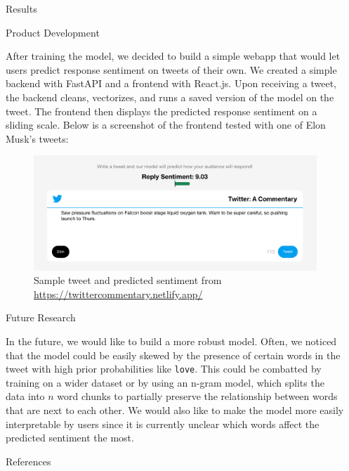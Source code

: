 \documentclass[final]{beamer}
\def\code#1{\texttt{#1}}
\newlength{\sepwidth}
\newlength{\colwidth}
\newcommand{\separatorcolumn}{\begin{column}{\sepwidth}\end{column}}
\begin{document}
\begin{frame}[t]
\begin{columns}[t]
\begin{column}{\colwidth}
\begin{alertblock}{Results}
    


  \end{alertblock}

  \begin{block}{Product Development}

    After training the model, we decided to build a simple webapp that would let users predict response sentiment on tweets of their own. We created a simple backend with FastAPI and a frontend with React.js. Upon receiving a tweet, the backend cleans, vectorizes, and runs a saved version of the model on the tweet. The frontend then displays the predicted response sentiment on a sliding scale. Below is a screenshot of the frontend tested with one of Elon Musk's tweets:

    \begin{figure}[H]
      \centering
      \includegraphics[width=1\textwidth]{product.png}
      \caption{Sample tweet and predicted sentiment from \href{https://twittercommentary.netlify.app/}{https://twittercommentary.netlify.app/}}
    \end{figure}

  \end{block}

  \begin{block}{Future Research}

    In the future, we would like to build a more robust model. Often, we noticed that the model could be easily skewed by the presence of certain words in the tweet with high prior probabilities like \code{love}. This could be combatted by training on a wider dataset or by using an n-gram model, which splits the data into $n$ word chunks to partially preserve the relationship between words that are next to each other. We would also like to make the model more easily interpretable by users since it is currently unclear which words affect the predicted sentiment the most.
  
  \end{block}

  \begin{block}{References}

    \footnotesize{}

  \end{block}

\end{column}

\separatorcolumn
\end{columns}
\end{frame}
\end{document}
